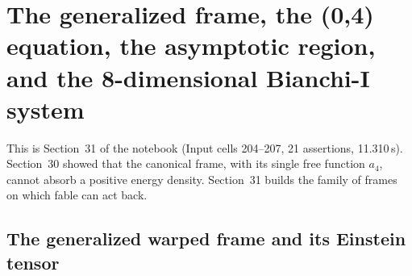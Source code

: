 \section{The generalized frame, the (0,4) equation, the asymptotic region, and the 8-dimensional Bianchi-I system}
\label{sec:5}

This is Section~31 of the notebook (Input cells 204--207, 21 assertions, 11.310\,s). Section~30 showed
that the canonical frame, with its single free function $a_4$, cannot absorb a positive energy
density. Section~31 builds the family of frames on which fable can act back.

\subsection{The generalized warped frame and its Einstein tensor}
\label{sec:5.1}

